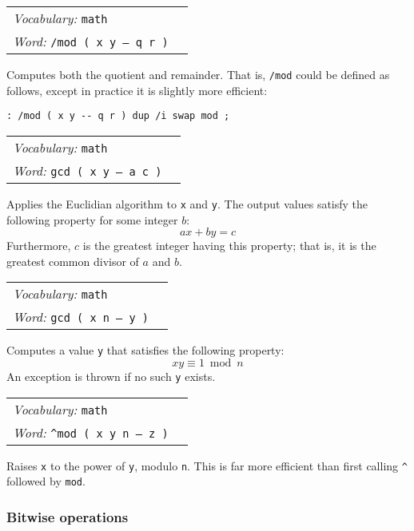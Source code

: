 \documentclass{book}
\newcommand{\vocabulary}[1]{\emph{Vocabulary:} \texttt{#1}&\\}
\newcommand{\ordinaryword}[2]{\index{\texttt{#1}}\emph{Word:} \texttt{#2}&\\}
\newcommand{\wordtable}[1]{

\begin{tabularx}{12cm}[t]{lX}
\hline
#1
\hline
\end{tabularx}

}
\begin{document}
\wordtable{
\vocabulary{math}
\ordinaryword{/mod}{/mod ( x y -- q r )}
}
Computes both the quotient and remainder. That is, \texttt{/mod} could be defined as follows, except in practice it is slightly more efficient:
\begin{verbatim}
: /mod ( x y -- q r ) dup /i swap mod ;
\end{verbatim}
\wordtable{
\vocabulary{math}
\ordinaryword{gcd}{gcd ( x y -- a c )}
}
Applies the Euclidian algorithm to \texttt{x} and \texttt{y}. The output values satisfy the following property for some integer $b$:
$$ax+by=c$$
Furthermore, $c$ is the greatest integer having this property; that is, it is the greatest common divisor of $a$ and $b$.
\wordtable{
\vocabulary{math}
\ordinaryword{mod-inv}{gcd ( x n -- y )}
}
Computes a value \texttt{y} that satisfies the following property:
$$xy \equiv 1 \bmod{n}$$ An exception is thrown if no such \texttt{y} exists.
\wordtable{
\vocabulary{math}
\ordinaryword{\^{}mod}{\^{}mod ( x y n -- z )}
}
Raises \texttt{x} to the power of \texttt{y}, modulo \texttt{n}. This is far more efficient than first calling \texttt{\^{}} followed by \texttt{mod}.

\subsubsection{\label{bitwise}Bitwise operations}
\end{document}
